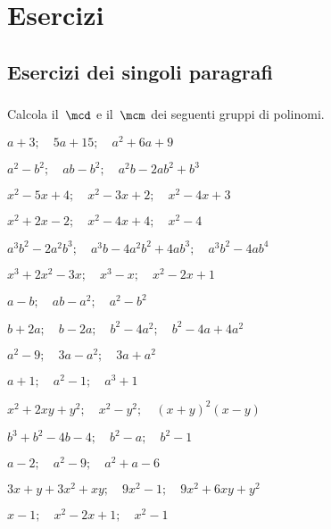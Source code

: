 
\section{Esercizi}

\subsection{Esercizi dei singoli paragrafi}

\subsubsection*{}

\begin{esercizio}[*]
\label{ese:18.1}
Calcola il~\(\mcd\) e il~\(\mcm\) dei seguenti gruppi di polinomi.
\begin{enumeratea}
\item \(a+3;\quad 5a+15;\quad a^{2}+6a+9\)
\item \(a^{2}-b^{2};\quad ab-b^{2};\quad a^{2}b-2ab^{2}+b^{3}\)
\item \(x^{2}-5x+4;\quad x^{2}-3x+2;\quad x^{2}-4x+3\)
\item \(x^{2}+2x-2;\quad x^{2}-4x+4;\quad x^{2}-4\)
\item \(a^{3}b^{2}-2a^{2}b^{3};\quad a^{3}b-4a^{2}b^{2}+4ab^{3};
\quad a^{3}b^{2}-4ab^{4}\)
\item \(x^{3}+2x^{2}-3x;\quad x^{3}-x;\quad x^{2}-2x+1\)
\item \(a-b;\quad ab-a^{2};\quad a^{2}-b^{2}\)
\item \(b+2a;\quad b-2a;\quad b^{2}-4a^{2};\quad b^{2}-4a+4a^{2}\)
\item \(a^{2}-9;\quad 3a-a^{2};\quad 3a+a^{2}\)
\item \(a+1;\quad a^{2}-1;\quad a^{3}+1\)
\item \(x^{2}+2xy+y^{2};\quad x^{2}-y^{2};\quad (x+y)^{2}(x-y)\)
\item \(b^{3}+b^{2}-4b-4;\quad b^{2}-a;\quad b^{2}-1\)
\item \(a-2;\quad a^{2}-9;\quad a^{2}+a-6\)
\item \(3x+y+3x^{2}+xy;\quad 9x^{2}-1;\quad 9x^{2}+6xy+y^{2}\)
\item \(x-1;\quad x^{2}-2x+1;\quad x^{2}-1\)%
\end{enumeratea}
\end{esercizio}

